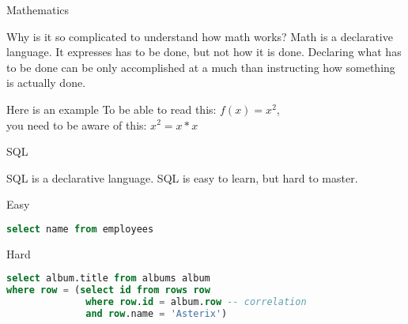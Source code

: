 \begin{frame}{Mathematics}
\begin{block}{Why is it so complicated to understand how math works?}
Math is a declarative language. It expresses  has to be done,
but not \alert{how} it is done. Declaring what has to be done can be only
accomplished at a much  than
instructing how something is actually done.
\end{block}
\pause
\begin{exampleblock}{Here is an example}
To be able to read this: \(f(x) = x^2\),\\ you need to be aware of this: \(x^2 =
x*x\)
\end{exampleblock}
\end{frame}

\begin{frame}[fragile]{SQL}
\begin{center}
SQL is a declarative language. SQL is easy to learn, but hard to master.
\end{center}
\pause
\begin{exampleblock}{Easy}
\begin{lstlisting}[language=sql]
select name from employees
\end{lstlisting}
\end{exampleblock}
\pause
\begin{alertblock}{Hard}
\begin{lstlisting}[language=sql]
select album.title from albums album
where row = (select id from rows row
              where row.id = album.row -- correlation
              and row.name = 'Asterix')
\end{lstlisting}
\end{alertblock}
\end{frame}

